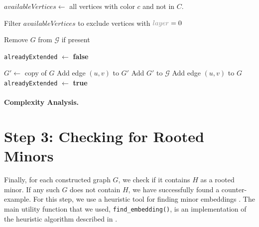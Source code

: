 \begin{algorithm}[H]
\begin{algorithmic}[1]
    \State $availableVertices \gets$ all vertices with color $c$ and not in $C$.
    
        \State Filter $availableVertices$ to exclude vertices with $\textcolor{gray}{layer} = 0$
    \EndIf
        
            \State \Return
        \EndIf
        \State Remove $G$ from $\mathcal{G}$ if present 
        \State \Return
    \EndIf


    \State \texttt{alreadyExtended} $\gets$ \textbf{false}
    
            \State $G' \gets$ copy of $G$
            \State Add edge $(u, v)$ to $G'$
            \State Add $G'$ to $\mathcal{G}$
            \State {}
        \Else
            \State Add edge $(u, v)$ to $G$
            \State {}
            \State \texttt{alreadyExtended} $\gets$ \textbf{true}
        \EndIf
    \EndFor
    
    \end{algorithmic}
    \end{algorithm}

\paragraph{Complexity Analysis.}


\section{Step 3: Checking for Rooted Minors}
Finally, for each constructed graph \( G \), we check if it contains \( H \) as a rooted minor. If any such \( G \) does not contain \( H \), we have successfully found a counter-example.
For this step, we use a heuristic tool for finding minor embeddings \cite{dwavesystems2023minorminer}. The main utility function that we used, \texttt{find\_embedding()},
is an implementation of the heuristic algorithm described in \cite{cai2014practicalheuristicfindinggraph}.

